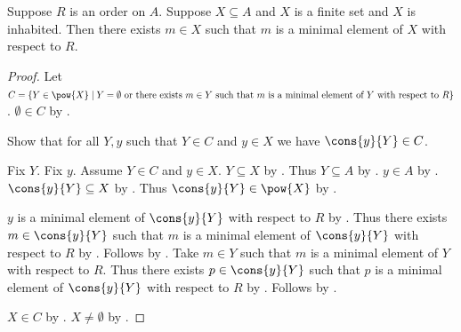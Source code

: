 \begin{theorem}\label{finite_minimal_element}
    Suppose $R$ is an order on $A$.
    Suppose $X\subseteq A$ and $X$ is a finite set and $X$ is inhabited.
    Then there exists $m\in X$ such that
        $m$ is a minimal element of $X$ with respect to $R$.
\end{theorem}
\begin{proof}
    Let $C=\{Y\in\pow{X}\mid
        \text{$Y=\emptyset$ or there exists $m\in Y$ such that
            $m$ is a minimal element of $Y$ with respect to $R$}\}$.
    $\emptyset\in C$ by .

    Show that for all $Y,y$ such that $Y\in C$ and $y\in X$ we have
        $\cons{y}{Y}\in C$.
    \begin{subproof}
        Fix $Y$.
        Fix $y$.
        Assume $Y\in C$ and $y\in X$.
        $Y\subseteq X$ by .
        Thus $Y\subseteq A$ by .
        $y\in A$ by .
        $\cons{y}{Y}\subseteq X$ by .
        Thus $\cons{y}{Y}\in\pow{X}$ by .
        \begin{byCase}
            $y$ is a minimal element of $\cons{y}{Y}$ with respect to $R$
                by .
            Thus there exists $m\in\cons{y}{Y}$ such that
                $m$ is a minimal element of $\cons{y}{Y}$ with respect to $R$
                by .
            Follows by \auto.
            Take $m\in Y$ such that
                $m$ is a minimal element of $Y$ with respect to $R$.
            Thus there exists $p\in\cons{y}{Y}$ such that
                $p$ is a minimal element of $\cons{y}{Y}$ with respect to $R$
                by .
            Follows by \auto.
        \end{byCase}
    \end{subproof}
    $X\in C$ by .
    $X\neq\emptyset$ by .
\end{proof}

